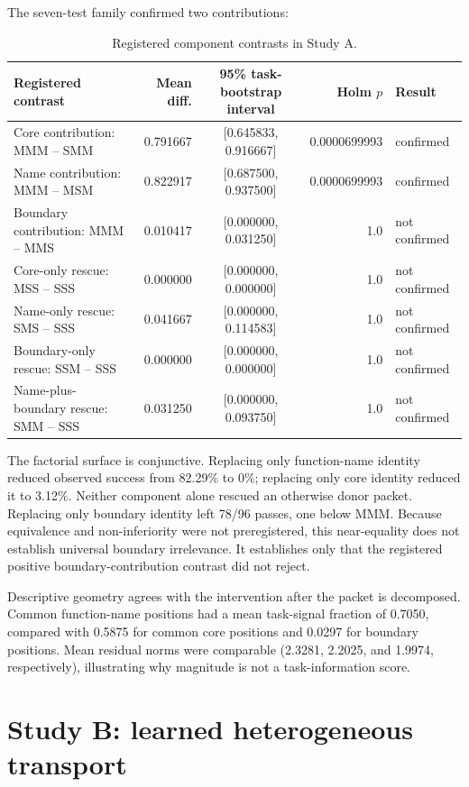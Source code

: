 \documentclass[11pt]{article}
\begin{document}
The seven-test family confirmed two contributions:

\begin{table}[htbp]
\centering
\caption{Registered component contrasts in Study A.}
\label{tab:study-a-contrasts}
\scriptsize
\begin{tabularx}{\textwidth}{>{\raggedright\arraybackslash}X r c r l}
\toprule
Registered contrast & Mean diff. & 95\% task-bootstrap interval & Holm \(p\) & Result \\
\midrule
Core contribution: MMM -- SMM & 0.791667 & [0.645833, 0.916667] & 0.0000699993 & confirmed \\
Name contribution: MMM -- MSM & 0.822917 & [0.687500, 0.937500] & 0.0000699993 & confirmed \\
Boundary contribution: MMM -- MMS & 0.010417 & [0.000000, 0.031250] & 1.0 & not confirmed \\
Core-only rescue: MSS -- SSS & 0.000000 & [0.000000, 0.000000] & 1.0 & not confirmed \\
Name-only rescue: SMS -- SSS & 0.041667 & [0.000000, 0.114583] & 1.0 & not confirmed \\
Boundary-only rescue: SSM -- SSS & 0.000000 & [0.000000, 0.000000] & 1.0 & not confirmed \\
Name-plus-boundary rescue: SMM -- SSS & 0.031250 & [0.000000, 0.093750] & 1.0 & not confirmed \\
\bottomrule
\end{tabularx}
\end{table}

The factorial surface is conjunctive. Replacing only function-name identity reduced observed success from 82.29\% to 0\%; replacing only core identity reduced it to 3.12\%. Neither component alone rescued an otherwise donor packet. Replacing only boundary identity left 78/96 passes, one below MMM. Because equivalence and non-inferiority were not preregistered, this near-equality does not establish universal boundary irrelevance. It establishes only that the registered positive boundary-contribution contrast did not reject.

Descriptive geometry agrees with the intervention after the packet is decomposed. Common function-name positions had a mean task-signal fraction of 0.7050, compared with 0.5875 for common core positions and 0.0297 for boundary positions. Mean residual norms were comparable (2.3281, 2.2025, and 1.9974, respectively), illustrating why magnitude is not a task-information score.

\section{Study B: learned heterogeneous transport}
\end{document}

